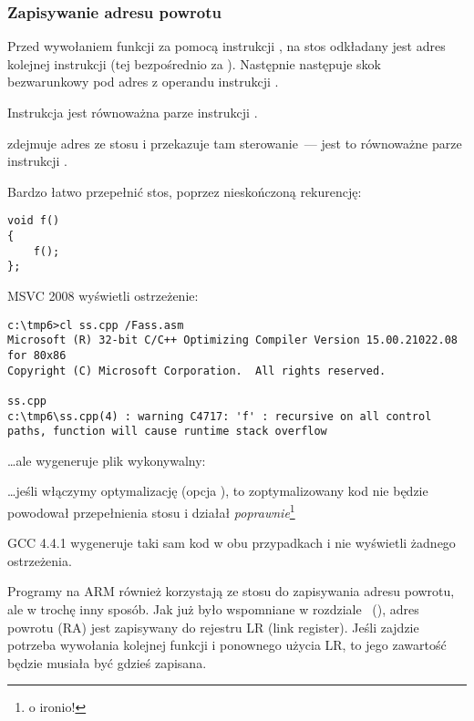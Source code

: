 \subsubsection{Zapisywanie adresu powrotu}


Przed wywołaniem funkcji za pomocą instrukcji \CALL, na stos odkładany jest adres kolejnej instrukcji (tej bezpośrednio za \CALL). Następnie następuje skok bezwarunkowy pod adres z operandu instrukcji \CALL.

Instrukcja \CALL jest równoważna parze instrukcji .

\RET zdejmuje adres ze stosu i przekazuje tam sterowanie~---
jest to równoważne parze instrukcji .

\myindex{\Stack!\MLStackOverflow}
\myindex{\Recursion}
Bardzo łatwo przepełnić stos, poprzez nieskończoną rekurencję:

\begin{lstlisting}[style=customc]
void f()
{
	f();
};
\end{lstlisting}

MSVC 2008 wyświetli ostrzeżenie:

\begin{lstlisting}
c:\tmp6>cl ss.cpp /Fass.asm
Microsoft (R) 32-bit C/C++ Optimizing Compiler Version 15.00.21022.08 for 80x86
Copyright (C) Microsoft Corporation.  All rights reserved.

ss.cpp
c:\tmp6\ss.cpp(4) : warning C4717: 'f' : recursive on all control paths, function will cause runtime stack overflow
\end{lstlisting}

\dots ale wygeneruje plik wykonywalny:



\dots jeśli włączymy optymalizację (opcja \TT{\Ox}), to zoptymalizowany kod nie będzie powodował przepełnienia stosu i działał  \emph{poprawnie}\footnote{o ironio!}



GCC 4.4.1 wygeneruje taki sam kod w obu przypadkach i nie wyświetli żadnego ostrzeżenia.


Programy na ARM również korzystają ze stosu do zapisywania adresu powrotu, ale w trochę inny sposób.
Jak już było wspomniane w rozdziale \q{\HelloWorldSectionName}~(),
adres powrotu (\ac{RA}) jest zapisywany do rejestru \ac{LR} (\gls{link register}).
Jeśli zajdzie potrzeba wywołania kolejnej funkcji i ponownego użycia  \ac{LR}, to jego zawartość będzie musiała być gdzieś zapisana.

